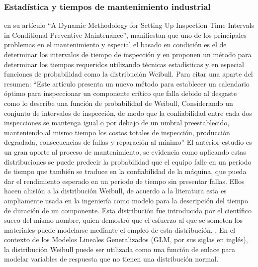 \documentclass[
  11pt,
  bookmarksnumbered]{article}
\begin{document}
\hypertarget{estaduxedstica-y-tiempos-de-mantenimiento-industrial}{%
\subsubsection{Estadística y tiempos de mantenimiento industrial}\label{estaduxedstica-y-tiempos-de-mantenimiento-industrial}}

\textcite{Assis2021} en su artículo ``A Dynamic Methodology for Setting Up Inspection Time Intervals in Conditional Preventive Maintenance'', manifiestan que uno de los principales problemas en el mantenimiento y especial el basado en condición es el de determinar los intervalos de tiempo de inspección y en proponen un método para determinar los tiempos requeridos utilizando técnicas estadísticas y en especial funciones de probabilidad como la distribución Weibull.
Para citar una aparte del resumen: ``Este artículo presenta un nuevo método para establecer un calendario óptimo para inspeccionar un componente crítico que falla debido al desgaste como lo describe una función de probabilidad de Weibull, Considerando un conjunto de intervalos de inspección, de modo que la confiabilidad entre cada dos inspecciones se mantenga igual o por debajo de un umbral preestablecido, manteniendo al mismo tiempo los costos totales de inspección, producción degradada, consecuencias de fallas y reparación al mínimo'' El anterior estudio es un gran aporte al proceso de mantenimiento, se evidencia como aplicando estas distribuciones se puede predecir la probabilidad que el equipo falle en un periodo de tiempo que también se traduce en la confiabilidad de la máquina, que pueda dar el rendimiento esperado en un periodo de tiempo sin presentar fallas.
Ellos hacen alusión a la distribución Weibull, de acuerdo a la literatura esta es ampliamente usada en la ingeniería como modelo para la descripción del tiempo de duración de un componente.
Esta distribución fue introducida por el científico sueco del mismo nombre, quien demostró que el esfuerzo al que se someten los materiales puede modelarse mediante el empleo de esta distribución.
\textcite{Castaneda2004}.
En el contexto de los Modelos Lineales Generalizados (GLM, por sus siglas en inglés), la distribución Weibull puede ser utilizada como una función de enlace para modelar variables de respuesta que no tienen una distribución normal.
\end{document}
